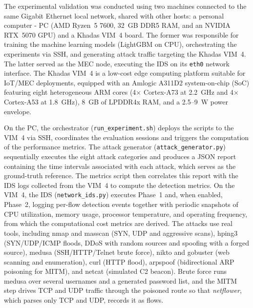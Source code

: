 \documentclass[conference]{IEEEtran}
\begin{document}
The experimental validation was conducted using two machines connected to the same Gigabit Ethernet local network, shared with other hosts: a personal computer - PC (AMD Ryzen~5 7600, 32~GB DDR5 RAM, and an NVIDIA RTX~5070 GPU) and a Khadas VIM~4 board. The former was responsible for training the machine learning models (LightGBM on CPU), orchestrating the experiments via SSH, and generating attack traffic targeting the Khadas VIM~4. The latter served as the MEC node, executing the IDS on its \texttt{eth0} network interface. The Khadas VIM~4 is a low-cost edge computing platform suitable for IoT/MEC deployments, equipped with an Amlogic A311D2 system-on-chip (SoC) featuring eight heterogeneous ARM cores (4× Cortex-A73 at 2.2~GHz and 4× Cortex-A53 at 1.8~GHz), 8~GB of LPDDR4x RAM, and a 2.5--9~W power envelope.


On the PC, the orchestrator (\texttt{run\_experiment.sh}) deploys the scripts to the VIM~4 via SSH, coordinates the evaluation sessions and triggers the computation of the performance metrics. The attack generator (\texttt{attack\_generator.py}) sequentially executes the eight attack categories and produces a JSON report containing the time intervals associated with each attack, which serves as the ground-truth reference. The metrics script then correlates this report with the IDS logs collected from the VIM~4 to compute the detection metrics. 
On the VIM~4, the IDS (\texttt{network\_ids.py}) executes Phase~1 and, when enabled, Phase~2, logging per-flow detection events together with periodic snapshots of CPU utilization, memory usage, processor temperature, and operating frequency, from which the computational cost metrics are derived. The attacks use real tools, including 
nmap and masscan (SYN, UDP and aggressive scans), hping3 (SYN/UDP/ICMP floods, DDoS with random sources and spoofing with a forged source), medusa (SSH/HTTP/Telnet brute force), nikto and gobuster (web scanning and enumeration), curl (HTTP flood), arpspoof (bidirectional ARP poisoning for
MITM), and netcat (simulated C2 beacon). Brute force runs medusa over several
usernames and a generated password list, and the MITM step drives TCP and UDP
traffic through the poisoned route so that \textit{netflower}, which parses only
TCP and UDP, records it as flows.
\end{document}
